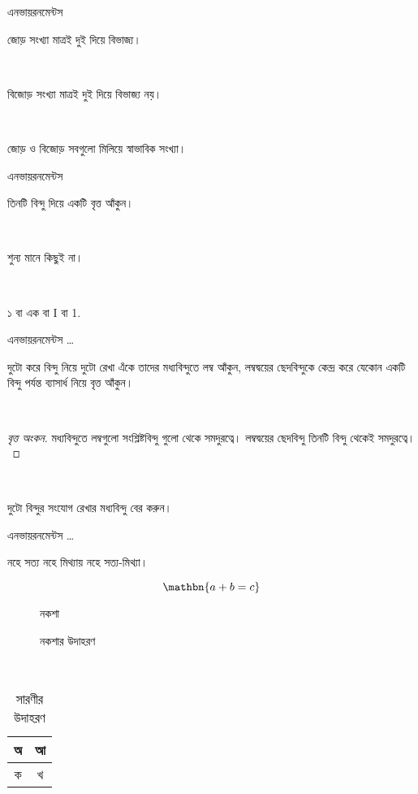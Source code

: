 \documentclass[xetex]{beamer}
\begin{document}
\begin{frame}{এনভায়রনমেন্টস}
	‌\begin{theorem}[জোড় সংখ্যা]
	জোড় সংখ্যা মাত্রই দুই দিয়ে বিভাজ্য।
	\end{theorem}
	‌\begin{lemma}[বিজোড় সংখ্যা]
	বিজোড় সংখ্যা মাত্রই দুই দিয়ে বিভাজ্য নয়।
	\end{lemma}
	‌\begin{corollary}[স্বাভাবিক সংখ্যা]
	জোড় ও বিজোড় সবগুলো মিলিয়ে স্বাভাবিক সংখ্যা।
	\end{corollary}
\end{frame}

\begin{frame}{এনভায়রনমেন্টস}
	‌\begin{problem}[বৃত্ত অংকন]
	তিনটি বিন্দু দিয়ে একটি বৃত্ত আঁকুন।
	\end{problem}
	‌\begin{definition}[শুন্য]
	শুন্য মানে কিছুই না।
	\end{definition}
	‌\begin{example}[এক]
	১ বা এক বা {\rm I} বা {\rm 1}.
	\end{example}
\end{frame}

\begin{frame}{এনভায়রনমেন্টস ‌\ldots}
	‌\begin{solution}[বৃত্ত অংকন]
	দুটো করে বিন্দু নিয়ে দুটো রেখা এঁকে তাদের মধ্যবিন্দুতে লম্ব আঁকুন, লম্বদ্বয়ের ছেদবিন্দুকে কেন্দ্র করে যেকোন একটি বিন্দু পর্যন্ত ব্যাসার্ধ নিয়ে বৃত্ত আঁকুন।
	\end{solution}
	‌\begin{proof}[বৃত্ত অংকন]
	মধ্যবিন্দুতে লম্বগুলো সংশ্লিষ্টবিন্দু গুলো থেকে সমদুরত্বে। লম্বদ্বয়ের ছেদবিন্দু তিনটি বিন্দু থেকেই সমদুরত্বে।
	\end{proof}
	‌\begin{exercise}[মধ্যবিন্দু]
	দুটো বিন্দুর সংযোগ রেখার মধ্যবিন্দু বের করুন।
	\end{exercise}
\end{frame}

\begin{frame}{এনভায়রনমেন্টস ‌\ldots}
	\begin{proposition}[সত্য]
	নহে সত্য নহে মিথ্যায় নহে সত্য-মিথ্যা। 
	\end{proposition}
	\begin{equation}
	\mathbn{a + b = c}
	\end{equation}
	\begin{figure}
	‌{‌\Huge\bnem ‌নকশা}
	\caption{নকশার উদাহরণ}
	\end{figure}
	\vspace{-3em}
	\begin{table}
	\caption{সারণীর উদাহরণ}
	‌\begin{tabular}{|c|c|}
	\hline
	অ & আ‌‌\\\hline
	ক & খ\\\hline
	\end{tabular}
	\end{table}
\end{frame}
\end{document}
